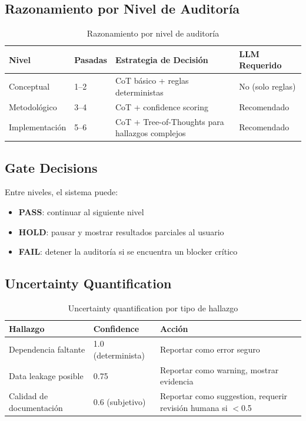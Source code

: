\documentclass[12pt,a4paper]{article}
\begin{document}
\subsection*{Razonamiento por Nivel de Auditoría}
\begin{table}[h]
\centering
\begin{tabular}{llll}
\toprule
\textbf{Nivel} & \textbf{Pasadas} & \textbf{Estrategia de Decisión} & \textbf{LLM Requerido} \\
\midrule
Conceptual     & 1--2 & CoT básico + reglas deterministas & No (solo reglas) \\
Metodológico   & 3--4 & CoT + confidence scoring & Recomendado \\
Implementación & 5--6 & CoT + Tree-of-Thoughts para hallazgos complejos & Recomendado \\
\bottomrule
\end{tabular}
\caption{Razonamiento por nivel de auditoría}
\end{table}

\subsection*{Gate Decisions}
Entre niveles, el sistema puede:
\begin{itemize}
  \item \textbf{PASS}: continuar al siguiente nivel
  \item \textbf{HOLD}: pausar y mostrar resultados parciales al usuario
  \item \textbf{FAIL}: detener la auditoría si se encuentra un blocker crítico
\end{itemize}

\subsection*{Uncertainty Quantification}
\begin{table}[h]
\centering
\begin{tabular}{lll}
\toprule
\textbf{Hallazgo} & \textbf{Confidence} & \textbf{Acción} \\
\midrule
Dependencia faltante      & 1.0 (determinista) & Reportar como error seguro \\
Data leakage posible       & 0.75               & Reportar como warning, mostrar evidencia \\
Calidad de documentación   & 0.6 (subjetivo)    & Reportar como suggestion, requerir revisión humana si $<$0.5 \\
\bottomrule
\end{tabular}
\caption{Uncertainty quantification por tipo de hallazgo}
\end{table}
\end{document}
